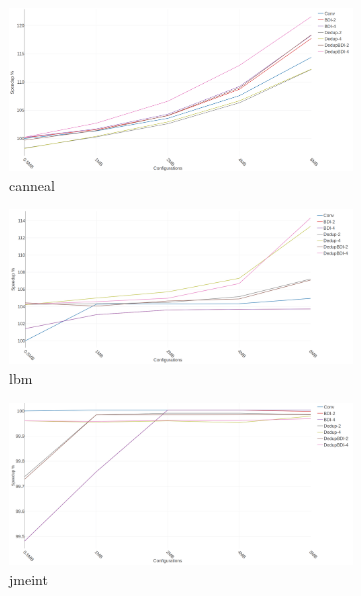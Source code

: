 \begin{figure}
    \begin{subfigure}{0.5\textwidth}
        \includegraphics[width=\textwidth]{canneal-speedup.png}
        \caption{canneal}
    \end{subfigure}
    \begin{subfigure}{0.5\textwidth}
        \includegraphics[width=\textwidth]{lbm-speedup.png}
        \caption{lbm}
    \end{subfigure}
    \begin{subfigure}{0.5\textwidth}
        \includegraphics[width=\textwidth]{jmeint-speedup.png}
        \caption{jmeint}
    \end{subfigure}
    \begin{subfigure}{0.5\textwidth}

\end{subfigure}
\end{figure}
